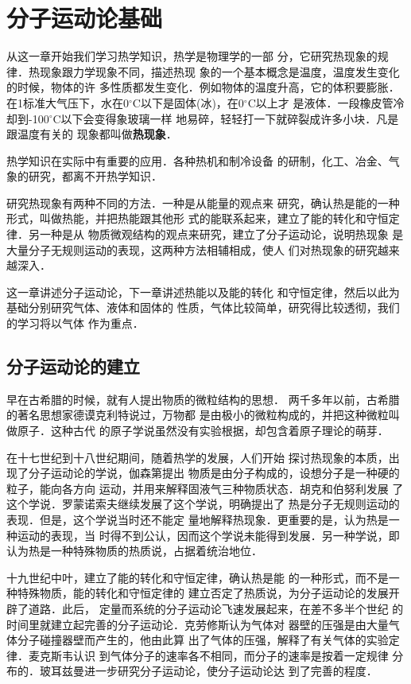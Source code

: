 \chapter{分子运动论基础}
从这一章开始我们学习热学知识，热学是物理学的一部
分，它研究热现象的规律．热现象跟力学现象不同，描述热现
象的一个基本概念是温度，温度发生变化的时候，物体的许
多性质都发生变化．例如物体的温度升高，它的体积要膨胀．
在1标准大气压下，水在0$^\circ$C以下是固体(冰)，在0$^\circ$C以上才
是液体．一段橡皮管冷却到-100$^\circ$C以下会变得象玻璃一样
地易碎，轻轻打一下就碎裂成许多小块．凡是跟温度有关的
现象都叫做\textbf{热现象}．

热学知识在实际中有重要的应用．各种热机和制冷设备
的研制，化工、冶金、气象的研究，都离不开热学知识．

研究热现象有两种不同的方法．一种是从能量的观点来
研究，确认热是能的一种形式，叫做热能，并把热能跟其他形
式的能联系起来，建立了能的转化和守恒定律．另一种是从
物质微观结构的观点来研究，建立了分子运动论，说明热现象
是大量分子无规则运动的表现，这两种方法相辅相成，使人
们对热现象的研究越来越深入．

这一章讲述分子运动论，下一章讲述热能以及能的转化
和守恒定律，然后以此为基础分别研究气体、液体和固体的
性质，气体比较简单，研究得比较透彻，我们的学习将以气体
作为重点．

\section{分子运动论的建立}
    早在古希腊的时候，就有人提出物质的微粒结构的思想．
两千多年以前，古希腊的著名思想家德谟克利特说过，万物都
是由极小的微粒构成的，并把这种微粒叫做原子．这种古代
的原子学说虽然没有实验根据，却包含着原子理论的萌芽．

    在十七世纪到十八世纪期间，随着热学的发展，人们开始
探讨热现象的本质，出现了分子运动论的学说，伽森第提出
物质是由分子构成的，设想分子是一种硬的粒子，能向各方向
运动，并用来解释固液气三种物质状态．胡克和伯努利发展
了这个学说．罗蒙诺索夫继续发展了这个学说，明确提出了
热是分子无规则运动的表现．但是，这个学说当时还不能定
量地解释热现象．更重要的是，认为热是一种运动的表现，当
时得不到公认，因而这个学说未能得到发展．另一种学说，即
认为热是一种特殊物质的热质说，占据着统治地位．

   十九世纪中叶，建立了能的转化和守恒定律，确认热是能
的一种形式，而不是一种特殊物质，能的转化和守恒定律的
建立否定了热质说，为分子运动论的发展开辟了道路．此后，
定量而系统的分子运动论飞速发展起来，在差不多半个世纪
的时间里就建立起完善的分子运动论．克劳修斯认为气体对
器壁的压强是由大量气体分子碰撞器壁而产生的，他由此算
出了气体的压强，解释了有关气体的实验定律．麦克斯韦认识
到气体分子的速率各不相同，而分子的速率是按着一定规律
分布的．玻耳兹曼进一步研究分子运动论，使分子运动论达
到了完善的程度．


